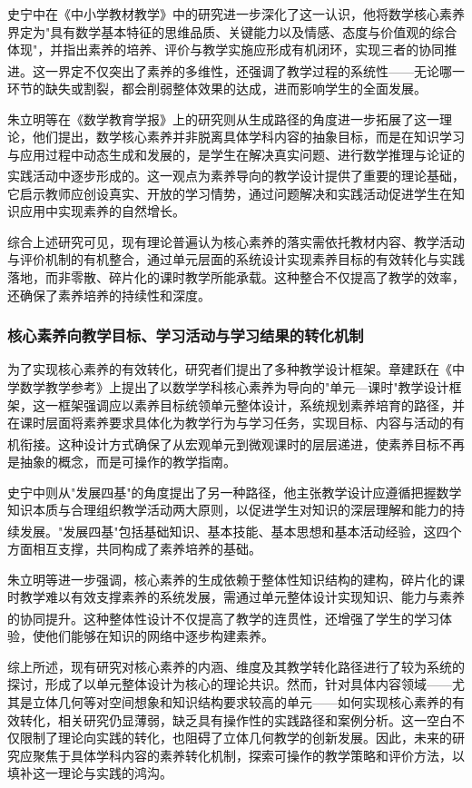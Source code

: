 \documentclass[UTF8,a4paper,12pt,twoside]{ctexart}
\begin{document}
史宁中在《中小学教材教学》中的研究进一步深化了这一认识，他将数学核心素养界定为"具有数学基本特征的思维品质、关键能力以及情感、态度与价值观的综合体现"，并指出素养的培养、评价与教学实施应形成有机闭环，实现三者的协同推进\textsuperscript{\cite{shi2017}}。这一界定不仅突出了素养的多维性，还强调了教学过程的系统性——无论哪一环节的缺失或割裂，都会削弱整体效果的达成，进而影响学生的全面发展。

朱立明等在《数学教育学报》上的研究则从生成路径的角度进一步拓展了这一理论，他们提出，数学核心素养并非脱离具体学科内容的抽象目标，而是在知识学习与应用过程中动态生成和发展的，是学生在解决真实问题、进行数学推理与论证的实践活动中逐步形成的\textsuperscript{\cite{zhu2018}}。这一观点为素养导向的教学设计提供了重要的理论基础，它启示教师应创设真实、开放的学习情势，通过问题解决和实践活动促进学生在知识应用中实现素养的自然增长。

综合上述研究可见，现有理论普遍认为核心素养的落实需依托教材内容、教学活动与评价机制的有机整合，通过单元层面的系统设计实现素养目标的有效转化与实践落地，而非零散、碎片化的课时教学所能承载。这种整合不仅提高了教学的效率，还确保了素养培养的持续性和深度。

\subsubsection{核心素养向教学目标、学习活动与学习结果的转化机制}

为了实现核心素养的有效转化，研究者们提出了多种教学设计框架。章建跃在《中学数学教学参考》上提出了以数学学科核心素养为导向的"单元—课时"教学设计框架，这一框架强调应以素养目标统领单元整体设计，系统规划素养培育的路径，并在课时层面将素养要求具体化为教学行为与学习任务，实现目标、内容与活动的有机衔接\textsuperscript{\cite{zhang2020}}。这种设计方式确保了从宏观单元到微观课时的层层递进，使素养目标不再是抽象的概念，而是可操作的教学指南。

史宁中则从"发展四基"的角度提出了另一种路径，他主张教学设计应遵循把握数学知识本质与合理组织教学活动两大原则，以促进学生对知识的深层理解和能力的持续发展\textsuperscript{\cite{shi2017}}。"发展四基"包括基础知识、基本技能、基本思想和基本活动经验，这四个方面相互支撑，共同构成了素养培养的基础。

朱立明等进一步强调，核心素养的生成依赖于整体性知识结构的建构，碎片化的课时教学难以有效支撑素养的系统发展，需通过单元整体设计实现知识、能力与素养的协同提升\textsuperscript{\cite{zhu2018}}。这种整体性设计不仅提高了教学的连贯性，还增强了学生的学习体验，使他们能够在知识的网络中逐步构建素养。

综上所述，现有研究对核心素养的内涵、维度及其教学转化路径进行了较为系统的探讨，形成了以单元整体设计为核心的理论共识。然而，针对具体内容领域——尤其是立体几何等对空间想象和知识结构要求较高的单元——如何实现核心素养的有效转化，相关研究仍显薄弱，缺乏具有操作性的实践路径和案例分析。这一空白不仅限制了理论向实践的转化，也阻碍了立体几何教学的创新发展。因此，未来的研究应聚焦于具体学科内容的素养转化机制，探索可操作的教学策略和评价方法，以填补这一理论与实践的鸿沟。
\end{document}

